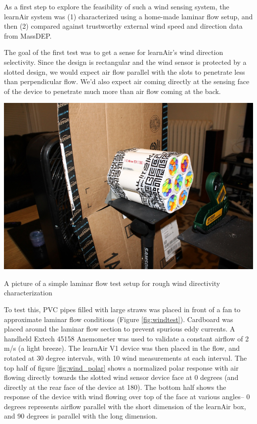 As a first step to explore the feasibility of such a wind sensing system, the learnAir system was (1) characterized using a home-made laminar flow setup, and then (2) compared against trustworthy external wind speed and direction data from MassDEP.  

The goal of the first test was to get a sense for learnAir's wind direction selectivity.  Since the design is rectangular and the wind sensor is protected by a slotted design, we would expect air flow parallel with the slots to penetrate less than perpendicular flow.  We'd also expect air coming directly at the sensing face of the device to penetrate much more than air flow coming at the back.

\begin{marginfigure}
 	\includegraphics[width=\textwidth]{visuals/windtest}               
 	 \caption{A picture of a simple laminar flow test setup for rough wind directivity characterization}
  	\label{fig:windtest}
\end{marginfigure}

\enlargethispage{2cm}


To test this, PVC pipes filled with large straws was placed in front of a fan to approximate laminar flow conditions (Figure \ref{fig:windtest}).  Cardboard was placed around the laminar flow section to prevent spurious eddy currents.  A handheld Extech 45158 Anemometer was used to validate a constant airflow of 2 m/s (a light breeze).  The learnAir V1 device was then placed in the flow, and rotated at 30 degree intervals, with 10 wind measurements at each interval.  The top half of figure \ref{fig:wind_polar} shows a normalized polar response with air flowing directly towards the slotted wind sensor device face at 0 degrees (and directly at the rear face of the device at 180).  The bottom half shows the response of the device with wind flowing over top of the face at various angles-- 0 degrees represents airflow parallel with the short dimension of the learnAir box, and 90 degrees is parallel with the long dimension.

